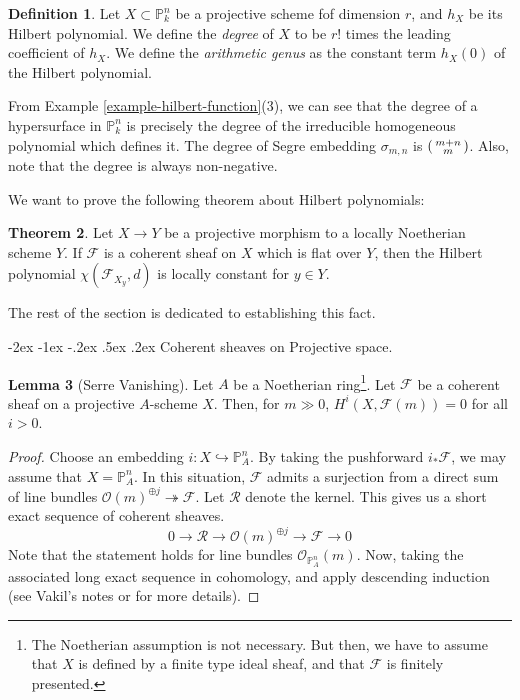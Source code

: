 \documentclass[11pt]{amsart}
\makeatletter
\renewcommand\subsection{\@startsection {subsection}{1}{\z@}%
	{-2ex \@plus -1ex \@minus -.2ex}%
	{.5ex \@plus.2ex}%
	{\normalfont\bfseries}}
\newcommand{\sF}{{\mathcal F}}
\newcommand{\sO}{{\mathcal O}}
\newcommand{\sR}{{\mathcal R}}
\renewcommand{\P}{{\mathbb P}}
\theoremstyle{definition}
\newtheorem{theorem}{Theorem}[section]
\newtheorem{lemma}[theorem]{Lemma}
\newtheorem{definition}[theorem]{Definition}
\makeatother
\begin{document}
\begin{definition}
	Let $X\subset \P_k^n$ be a projective scheme fof dimension $r$, and $h_X$ be its Hilbert polynomial. We define the \textit{degree} of $X$ to be $r!$ times the leading coefficient of $h_X$. We define the \textit{arithmetic genus} as the constant term $h_X(0)$ of the Hilbert polynomial.
\end{definition}

From Example \ref{example-hilbert-function}(3), we can see that the degree of a hypersurface in $\P_k^n$ is precisely the degree of the irreducible homogeneous polynomial which defines it. The degree of Segre embedding $\sigma_{m,n}$ is $\begin{psmallmatrix}
	m + n \\
	m
\end{psmallmatrix}$. Also, note that the degree is always non-negative.
\medskip

We want to prove the following theorem about Hilbert polynomials:

\begin{theorem}
	\label{theorem-hilbert-polynomial-in-flat-family}
	Let $X\rightarrow Y$ be a projective morphism to a locally Noetherian scheme $Y$. If $\sF$ is a coherent sheaf on $X$ which is flat over $Y$, then the Hilbert polynomial $\chi(\sF_{X_y},d)$ is locally constant for $y\in Y$.
\end{theorem}

The rest of the section is dedicated to establishing this fact.


\subsection{Coherent sheaves on Projective space.}

\begin{lemma}[Serre Vanishing]
	\label{lemma-serre-vanishing}
	Let $A$ be a Noetherian ring\footnote{The Noetherian assumption is not necessary. But then, we have to assume that $X$ is defined by a finite type ideal sheaf, and that $\sF$ is finitely presented.}. Let $\sF$ be a coherent sheaf on a projective $A$-scheme $X$. Then, for $m\gg 0$, $H^i(X,\sF(m))=0$ for all $i>0$.
\end{lemma}
\begin{proof}
	Choose an embedding $i:X\hookrightarrow \P_A^n$. By taking the pushforward $i_*\sF$, we may assume that $X=\P_A^n$. In this situation, $\sF$ admits a surjection from a direct sum of line bundles $\sO(m)^{\oplus j}\twoheadrightarrow \sF$. Let $\sR$ denote the kernel. This gives us a short exact sequence of coherent sheaves. 
	\[0\rightarrow \sR \rightarrow\sO(m)^{\oplus j}\rightarrow \sF\rightarrow 0\]
	Note that the statement holds for line bundles $\sO_{\P_A^n}(m)$. Now, taking the associated long exact sequence in cohomology, and apply descending induction (see Vakil's notes or \cite[III, 5.2]{Hart1} for more details).
\end{proof}
\end{document}
